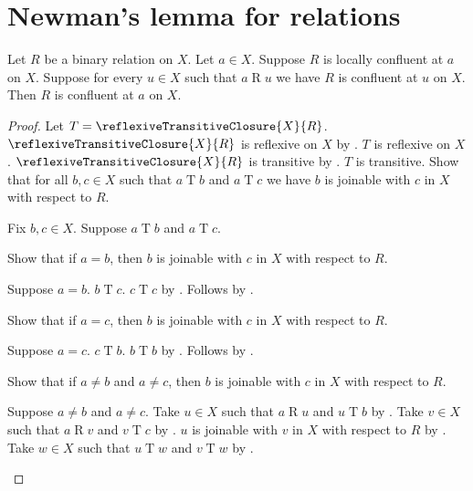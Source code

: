 

\section{Newman's lemma for relations}

\begin{lemma}\label{local_confluence_confluence_step}
    Let $R$ be a binary relation on $X$.
    Let $a\in X$.
    Suppose $R$ is locally confluent at $a$ on $X$.
    Suppose for every $u\in X$ such that $a\mathrel{R}u$
        we have $R$ is confluent at $u$ on $X$.
    Then $R$ is confluent at $a$ on $X$.
\end{lemma}
\begin{proof}
    Let $T=\reflexiveTransitiveClosure{X}{R}$.
    $\reflexiveTransitiveClosure{X}{R}$ is reflexive on $X$
        by .
    $T$ is reflexive on $X$.
    $\reflexiveTransitiveClosure{X}{R}$ is transitive
        by .
    $T$ is transitive.
    Show that for all $b,c\in X$ such that $a\mathrel{T}b$ and
        $a\mathrel{T}c$ we have
        $b$ is joinable with $c$ in $X$ with respect to $R$.
    \begin{subproof}
        Fix $b,c\in X$.
        Suppose $a\mathrel{T}b$ and $a\mathrel{T}c$.

        Show that if $a=b$, then
            $b$ is joinable with $c$ in $X$ with respect to $R$.
        \begin{subproof}
            Suppose $a=b$.
            $b\mathrel{T}c$.
            $c\mathrel{T}c$ by .
            Follows by .
        \end{subproof}
        Show that if $a=c$, then
            $b$ is joinable with $c$ in $X$ with respect to $R$.
        \begin{subproof}
            Suppose $a=c$.
            $c\mathrel{T}b$.
            $b\mathrel{T}b$ by .
            Follows by .
        \end{subproof}

        Show that if $a\neq b$ and $a\neq c$, then
            $b$ is joinable with $c$ in $X$ with respect to $R$.
        \begin{subproof}
            Suppose $a\neq b$ and $a\neq c$.
            Take $u\in X$ such that $a\mathrel{R}u$ and $u\mathrel{T}b$
                by .
            Take $v\in X$ such that $a\mathrel{R}v$ and $v\mathrel{T}c$
                by .
            $u$ is joinable with $v$ in $X$ with respect to $R$
                by .
            Take $w\in X$ such that $u\mathrel{T}w$ and $v\mathrel{T}w$
                by .


\end{subproof}
\end{subproof}
\end{proof}
